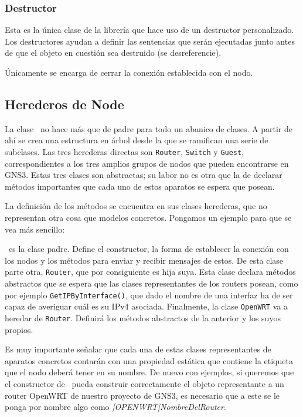 \subsubsection{Destructor}
Esta es la única clase de la librería que hace uso de un destructor personalizado. Los destructores ayudan a definir las sentencias que serán ejecutadas junto antes de que el objeto en cuestión sea destruido (se desreferencie).

Únicamente se encarga de cerrar la conexión establecida con el nodo.

\subsection{Herederos de Node}
La clase \NODE~no hace más que de padre para todo un abanico de clases. A partir de ahí se crea una estructura en árbol desde la que se ramifican una serie de subclases. Las tres herederas directas son \texttt{Router}, \texttt{Switch} y \texttt{Guest}, correspondientes a los tres amplios grupos de nodos que pueden encontrarse en GNS3. Estas tres clases son abstractas; su labor no es otra que la de declarar métodos importantes que cada uno de estos aparatos se espera que posean.

La definición de los métodos se encuentra en sus clases herederas, que no representan otra cosa que modelos concretos. Pongamos un ejemplo para que se vea más sencillo:

\NODE~es la clase padre. Define el constructor, la forma de establecer la conexión con los nodos y los métodos para enviar y recibir mensajes de estos. De esta clase parte otra, \texttt{Router}, que por consiguiente es hija suya. Esta clase declara métodos abstractos que se espera que las clases representantes de los routers posean, como por ejemplo \texttt{GetIPByInterface()}, que dado el nombre de una interfaz ha de ser capaz de averiguar cuál es su IPv4 asociada. Finalmente, la clase \texttt{OpenWRT} va a heredar de \texttt{Router}. Definirá los métodos abstractos de la anterior y los suyos propios.

Es muy importante señalar que cada una de estas clases representantes de aparatos concretos contarán con una propiedad estática que contiene la etiqueta que el nodo deberá tener en su nombre. De nuevo con ejemplos, si queremos que el constructor de \GNSCS~pueda construir correctamente el objeto representante a un router OpenWRT de nuestro proyecto de GNS3, es necesario que a este se le ponga por nombre algo como \textit{[OPENWRT]NombreDelRouter}.

